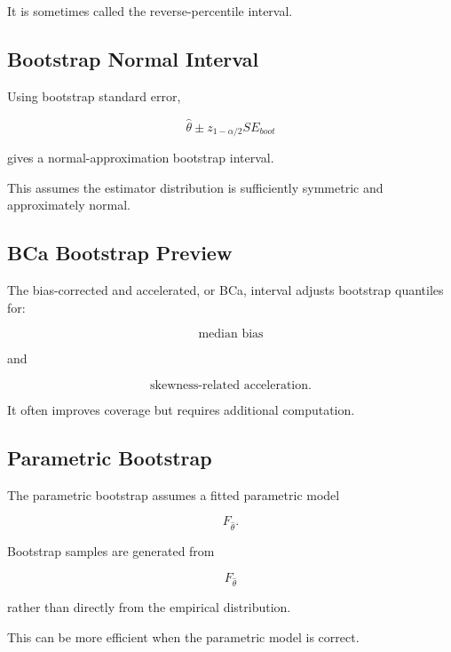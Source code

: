 It is sometimes called the reverse-percentile interval.

\subsection{Bootstrap Normal Interval}
\label{subsec:bootstrap-normal-interval}

Using bootstrap standard error,

\[
\boxed{
\widehat{\theta}
\pm
z_{1-\alpha/2}
\widehat{SE}_{boot}
}
\]

gives a normal-approximation bootstrap interval.

This assumes the estimator distribution is sufficiently symmetric and
approximately normal.

\subsection{BCa Bootstrap Preview}
\label{subsec:bca-bootstrap-preview}

The bias-corrected and accelerated, or BCa, interval adjusts bootstrap
quantiles for:

\[
\boxed{
\text{median bias}
}
\]

and

\[
\boxed{
\text{skewness-related acceleration}.
}
\]

It often improves coverage but requires additional computation.

\subsection{Parametric Bootstrap}
\label{subsec:parametric-bootstrap}

The parametric bootstrap assumes a fitted parametric model

\[
F_{\widehat{\theta}}.
\]

Bootstrap samples are generated from

\[
\boxed{
F_{\widehat{\theta}}
}
\]

rather than directly from the empirical distribution.

This can be more efficient when the parametric model is correct.

